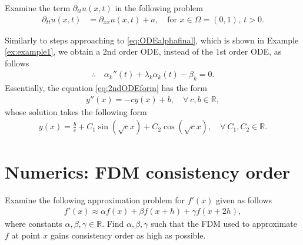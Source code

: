 \documentclass[12pt]{article}
\begin{document}
\newpage
\begin{example}
	Examine the term $\partial_{tt} u(x,t)$ in the following problem
	\begin{align}
		\partial_{tt} u(x,t) & =   \partial_{xx}u(x,t) + a, \quad \text{for } x\in\Omega = (0,1),\ t>0.
	\end{align}
\end{example}

Similarly to steps approaching to \eqref{eq:ODEalphafinal}, which is shown in Example \ref{ex:example1}, 
we obtain a 2nd order ODE, instead of the 1st order ODE, as follows
\begin{align}
	\label{eq:2ndODEform}
	\therefore\quad
	\boxed{
		\alpha_{k}''(t) + \lambda_k \alpha_k(t) - \beta_k = 0.
	}
\end{align}
Essentially, the equation \eqref{eq:2ndODEform} has the form 
\begin{align}
	y''(x) = -cy(x) + b,\quad\forall \ c,b\in\mathbb{R},
\end{align}
whose solution takes the following form
\begin{align}
	y(x) = \frac{b}{c}
	+ C_{1}\sin\left(\sqrt{c}x\right)
	+ C_{2}\cos\left(\sqrt{c}x\right),\quad\forall \ C_{1},C_{2}\in\mathbb{R}.
\end{align}

\newpage
\section{Numerics: FDM consistency order}
\begin{example}
	Examine the following approximation problem for $f'(x)$ given as follows
	\begin{align}
		\label{eq:givenproblemfxprime}
		f'(x) \approx \alpha f(x) + \beta f(x+h) + \gamma f(x+2h),
	\end{align}
	where constants $\alpha, \beta, \gamma \in\mathbb{R}$. 
	Find $\alpha, \beta, \gamma$ such that the FDM used to approximate $f$
	at point $x$ gains consistency order as high as possible.
\end{example}
\end{document}
